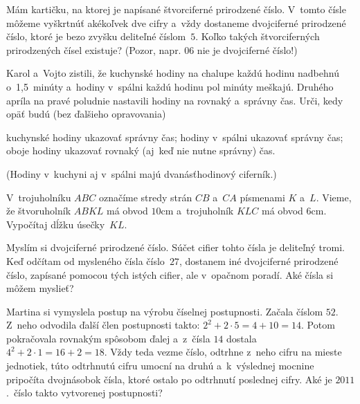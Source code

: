 {%
Mám kartičku, na ktorej je napísané štvorciferné prirodzené číslo. V~tomto čísle môžeme
vyškrtnúť akékoľvek dve cifry a~vždy dostaneme dvojciferné prirodzené číslo,
ktoré je bezo zvyšku deliteľné číslom~$5$. Koľko takých štvorciferných prirodzených čísel existuje?
(Pozor, napr. $06$ nie je dvojciferné číslo!)}

{%
Karol a~Vojto zistili, že kuchynské hodiny na chalupe každú hodinu nadbehnú o~1{,}5~minúty
a~hodiny v~spálni každú hodinu pol minúty meškajú. Druhého apríla
na pravé poludnie nastavili hodiny na rovnaký a~správny čas.
Urči, kedy opäť budú (bez ďalšieho opravovania)
\begin{enumerate}
  \iitem kuchynské hodiny ukazovať správny čas;
  \iitem hodiny v~spálni ukazovať správny čas;
  \iitem oboje hodiny ukazovať rovnaký (aj~keď nie nutne správny) čas.
\end{enumerate}
(Hodiny v~kuchyni aj v~spálni majú dvanásťhodinový ciferník.)}

{%
V~trojuholníku $ABC$ označíme stredy strán $CB$ a~$CA$ písmenami $K$ a~$L$.
Vieme, že štvoruholník $ABKL$ má obvod $10\text{cm}$ a~trojuholník $KLC$ má obvod
$6\text{cm}$.
Vypočítaj dĺžku úsečky~$KL$.}

{%
Myslím si dvojciferné prirodzené číslo. Súčet cifier tohto čísla je deliteľný tromi.
Keď odčítam od mysleného čísla číslo~$27$, dostanem iné dvojciferné prirodzené
číslo, zapísané pomocou tých istých cifier, ale v~opačnom poradí. Aké čísla si môžem
myslieť?}

{%
Martina si vymyslela postup na výrobu číselnej postupnosti. Začala číslom $52$.
Z~neho odvodila ďalší člen postupnosti takto: $2^2+2\cdot 5=4+10=14$.
Potom pokračovala rovnakým spôsobom ďalej a~z~čísla $14$ dostala
$4^2+2\cdot 1=16+2=18$. Vždy teda vezme číslo, odtrhne z~neho cifru na mieste
jednotiek, túto odtrhnutú cifru umocní na druhú a~k~výslednej mocnine pripočíta
dvojnásobok čísla, ktoré ostalo po odtrhnutí poslednej cifry. Aké je $2011$.~číslo takto vytvorenej postupnosti?
}


